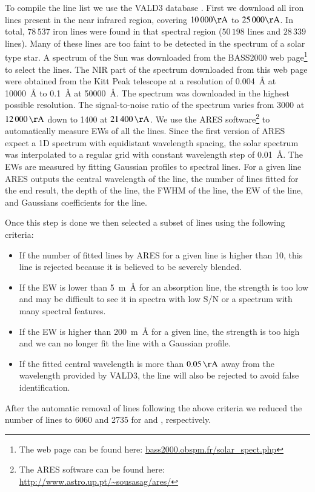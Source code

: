 \documentclass{aa}
\begin{document}
To compile the line list we use the VALD3 database \citep{VALD1,VALD2}.
First we download all iron lines present in the near infrared
region, covering $10\,000\si{\AA}$ to $25\,000\si{\AA}$. In
total, $78\,537$ iron lines were found in that spectral region
($50\,198$  lines and $28\,339$  lines).
Many of these lines are too faint to be detected in the spectrum
of a solar type star. A spectrum of the Sun was downloaded from
the BASS2000 web page\footnote{The web page can be found here:
\url{bass2000.obspm.fr/solar_spect.php}} to select the lines. The
NIR part of the spectrum downloaded from this web page were obtained
from the Kitt Peak telescope \citep{Hinkle1995} at a resolution of
\SI{0.004}{\angstrom} at \SI{10000}{\angstrom} to \SI{0.1}{\angstrom}
at \SI{50000}{\angstrom}. The spectrum was downloaded in the highest
possible resolution. The signal-to-noise ratio of the spectrum varies
from 3000 at $\SI{12000}{\AA}$ down to 1400 at $\SI{21400}{\AA}$. We
use the ARES software\footnote{The ARES software can be found here:
\url{http://www.astro.up.pt/~sousasag/ares/}}\citep{Sousa2007,Sousa2015a
} to automatically measure EWs of all the lines. Since the first version
of ARES expect a 1D spectrum with equidistant wavelength spacing,
the solar spectrum was interpolated to a regular grid with constant
wavelength step of \SI{0.01}{\angstrom}. The EWs are measured by fitting
Gaussian profiles to spectral lines. For a given line ARES outputs the
central wavelength of the line, the number of lines fitted for the end
result, the depth of the line, the FWHM of the line, the EW of the line,
and Gaussians coefficients for the line.

Once this step is done we then selected a subset of lines using the
following criteria:
\begin{itemize}
    \item If the number of fitted lines by ARES for a given line is higher than 10,
        this line is rejected because it is believed to be severely blended.
    \item If the EW is lower than \SI{5}{m\angstrom} for an absorption line, the strength
        is too low and may be difficult to see it in spectra with low S/N or a
        spectrum with many spectral features.
    \item If the EW is higher than \SI{200}{m\angstrom} for a given line, the strength
        is too high and we can no longer fit the line with a Gaussian profile.
    \item If the fitted central wavelength is more than $\SI{0.05}{\AA}$ away
        from the wavelength provided by VALD3, the line will also be rejected to
        avoid false identification.
\end{itemize}
After the automatic removal of lines following the above criteria
we reduced the number of lines to 6060 and 2735 for  and
, respectively.
\end{document}
